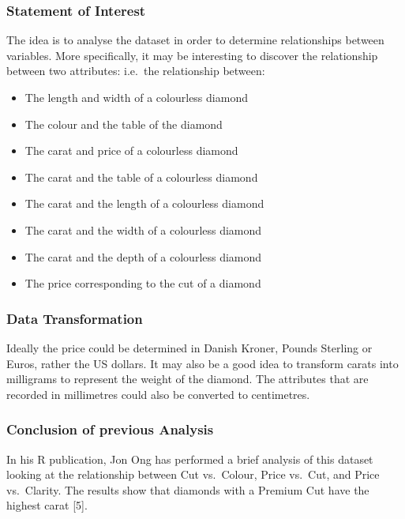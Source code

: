 \documentclass[
]{article}
\providecommand{\tightlist}{%
  \setlength{\itemsep}{0pt}\setlength{\parskip}{0pt}}
\begin{document}
\subsubsection{Statement of Interest}\label{statement-of-interest}

The idea is to analyse the dataset in order to determine relationships
between variables. More specifically, it may be interesting to discover
the relationship between two attributes: i.e.~the relationship between:

\begin{itemize}
\tightlist
\item
  The length and width of a colourless diamond
\item
  The colour and the table of the diamond
\item
  The carat and price of a colourless diamond
\item
  The carat and the table of a colourless diamond
\item
  The carat and the length of a colourless diamond
\item
  The carat and the width of a colourless diamond
\item
  The carat and the depth of a colourless diamond
\item
  The price corresponding to the cut of a diamond
\end{itemize}

\subsubsection{Data Transformation}\label{data-transformation}

Ideally the price could be determined in Danish Kroner, Pounds Sterling
or Euros, rather the US dollars. It may also be a good idea to transform
carats into milligrams to represent the weight of the diamond. The
attributes that are recorded in millimetres could also be converted to
centimetres.

\subsubsection{Conclusion of previous
Analysis}\label{conclusion-of-previous-analysis}

In his R publication, Jon Ong has performed a brief analysis of this
dataset looking at the relationship between Cut vs.~Colour, Price
vs.~Cut, and Price vs.~Clarity. The results show that diamonds with a
Premium Cut have the highest carat {[}5{]}.
\end{document}
